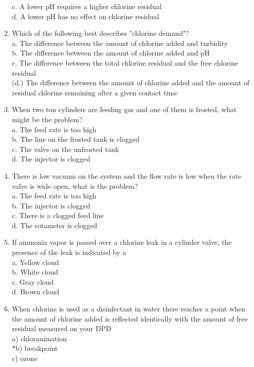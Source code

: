 \begin{enumerate}[1.]
c. A lower $\mathrm{pH}$ requires a higher chlorine residual\\
d. A lower $\mathrm{pH}$ has no effect on chlorine residual\\
\item Which of the following best describes "chlorine demand"?\\
a. The difference between the amount of chłorine added and turbidity\\
b. The difference between the amount of chlorine added and $\mathrm{pH}$\\
c. The difference between the total chlorine residual and the free chlorine residual\\
(d.) The difference between the amount of chlorine added and the amount of residual chlorine remaining after a given contact time\\
\item When two ton cylinders are feeding gas and one of them is frosted, what might be the problem?\\
a. The feed rate is too high\\
b. The line on the frosted tank is clogged\\
c. The valve on the unfrosted tank\\
d. The injector is clogged\\
\item There is low vacuum on the system and the flow rate is low when the rate valve is wide open, what is the problem?\\
a. The feed rate is too high\\
b. The injector is clogged\\
c. There is a clogged feed line\\
d. The rotameter is clogged
\item If ammonia vapor is passed over a chlorine leak in a cylinder valve, the presence of the leak is indicated by a\\
a. Yellow cloud\\
b. White cloud\\
c. Gray cloud\\
d. Brown cloud
\item When chlorine is used as a disinfectant in water there reaches a point when the amount of chlorine added is reflected identically with the amount of free residual measured on your DPD\\
a) chloramination\\
*b) breakpoint\\
c) ozone\\

\end{enumerate}

